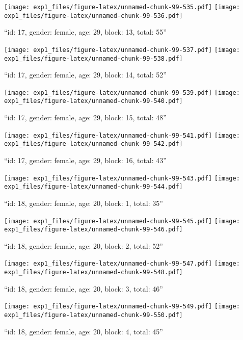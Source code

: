 \documentclass[,]{article}
\begin{document}
\texttt{[image: exp1\_files/figure-latex/unnamed-chunk-99-535.pdf]}
\texttt{[image: exp1\_files/figure-latex/unnamed-chunk-99-536.pdf]}

\newpage
[1] 

``id: 17, gender: female, age: 29, block: 13, total: 55''

\texttt{[image: exp1\_files/figure-latex/unnamed-chunk-99-537.pdf]}
\texttt{[image: exp1\_files/figure-latex/unnamed-chunk-99-538.pdf]}

\newpage
[1] 

``id: 17, gender: female, age: 29, block: 14, total: 52''

\texttt{[image: exp1\_files/figure-latex/unnamed-chunk-99-539.pdf]}
\texttt{[image: exp1\_files/figure-latex/unnamed-chunk-99-540.pdf]}

\newpage
[1] 

``id: 17, gender: female, age: 29, block: 15, total: 48''

\texttt{[image: exp1\_files/figure-latex/unnamed-chunk-99-541.pdf]}
\texttt{[image: exp1\_files/figure-latex/unnamed-chunk-99-542.pdf]}

\newpage
[1] 

``id: 17, gender: female, age: 29, block: 16, total: 43''

\texttt{[image: exp1\_files/figure-latex/unnamed-chunk-99-543.pdf]}
\texttt{[image: exp1\_files/figure-latex/unnamed-chunk-99-544.pdf]}

\newpage
[1] 

``id: 18, gender: female, age: 20, block: 1, total: 35''

\texttt{[image: exp1\_files/figure-latex/unnamed-chunk-99-545.pdf]}
\texttt{[image: exp1\_files/figure-latex/unnamed-chunk-99-546.pdf]}

\newpage
[1] 

``id: 18, gender: female, age: 20, block: 2, total: 52''

\texttt{[image: exp1\_files/figure-latex/unnamed-chunk-99-547.pdf]}
\texttt{[image: exp1\_files/figure-latex/unnamed-chunk-99-548.pdf]}

\newpage
[1] 

``id: 18, gender: female, age: 20, block: 3, total: 46''

\texttt{[image: exp1\_files/figure-latex/unnamed-chunk-99-549.pdf]}
\texttt{[image: exp1\_files/figure-latex/unnamed-chunk-99-550.pdf]}

\newpage
[1] 

``id: 18, gender: female, age: 20, block: 4, total: 45''
\end{document}
